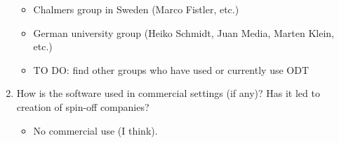 \documentclass[preprint,12pt, a4paper]{elsarticle}
\begin{document}
\begin{enumerate}
\begin{itemize}
			\item Chalmers group in Sweden (Marco Fistler, etc.)
			\item German university group (Heiko Schmidt, Juan Media, Marten Klein, etc.)
			\item TO DO: find other groups who have used or currently use ODT
		\end{itemize}
	\item How is the software used in commercial settings (if any)? Has it led to creation of spin-off companies?
		\begin{itemize}
			\item No commercial use (I think). 
		\end{itemize}
\end{enumerate}


\end{document}
